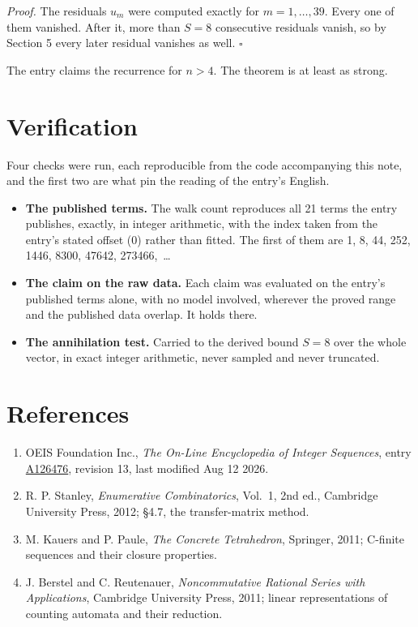 \documentclass[11pt]{article}
\theoremstyle{definition}
\begin{document}
{\itshape Proof.} The residuals $u_m$ were computed exactly for $m = 1,\dots,39$. Every one of them vanished. After it, more than $S = 8$ consecutive residuals vanish, so by Section 5 every later residual vanishes as well. $\square$

The entry claims the recurrence for $n > 4$. The theorem is at least as strong.

\section{Verification}

Four checks were run, each reproducible from the code accompanying this note, and the first two are what pin the reading of the entry's English.

\begin{itemize}

\item {\bfseries The published terms.} The walk count reproduces all 21 terms the entry publishes, exactly, in integer arithmetic, with the index taken from the entry's stated offset (0) rather than fitted. The first of them are 1, 8, 44, 252, 1446, 8300, 47642, 273466,~\dots

\item {\bfseries The claim on the raw data.} Each claim was evaluated on the entry's published terms alone, with no model involved, wherever the proved range and the published data overlap. It holds there.

\item {\bfseries The annihilation test.} Carried to the derived bound $S = 8$ over the whole vector, in exact integer arithmetic, never sampled and never truncated.

\end{itemize}

\section{References}

\begin{enumerate}

\item OEIS Foundation Inc., \emph{The On-Line Encyclopedia of Integer Sequences}, entry \href{https://oeis.org/A126476}{A126476}, revision 13, last modified Aug 12 2026.

\item R. P. Stanley, \emph{Enumerative Combinatorics}, Vol.~1, 2nd ed., Cambridge University Press, 2012; \S4.7, the transfer-matrix method.

\item M. Kauers and P. Paule, \emph{The Concrete Tetrahedron}, Springer, 2011; C-finite sequences and their closure properties.

\item J. Berstel and C. Reutenauer, \emph{Noncommutative Rational Series with Applications}, Cambridge University Press, 2011; linear representations of counting automata and their reduction.

\end{enumerate}
\end{document}

